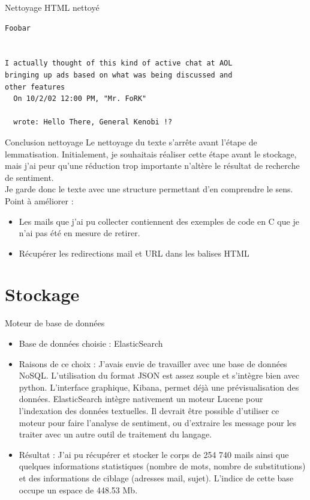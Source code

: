 \documentclass[xelatex,11pt, xcolor=dvipsnames]{beamer}
\begin{document}
\begin{frame}[fragile]{Nettoyage HTML nettoyé}
\small
\begin{verbatim}
Foobar


I actually thought of this kind of active chat at AOL 
bringing up ads based on what was being discussed and 
other features
  On 10/2/02 12:00 PM, "Mr. FoRK" 
   
  wrote: Hello There, General Kenobi !?
\end{verbatim}
\normalsize
\end{frame}

\begin{frame}{Conclusion nettoyage}
	Le nettoyage du texte s'arrête avant l'étape de lemmatisation. 
	Initialement, je souhaitais réaliser cette étape avant le stockage, 
	mais j'ai peur qu'une réduction trop importante n'altère le résultat de recherche de sentiment.\\
	
	Je garde donc le texte avec une structure permettant d'en comprendre le sens. \\
	
	Point à améliorer :
	\begin{itemize}
		\item Les mails que j'ai pu collecter contiennent des exemples de code en C que je n'ai pas été en mesure de retirer.
		\item Récupérer les redirections mail et URL dans les balises HTML
 	\end{itemize}  
\end{frame}


\section{Stockage}

\begin{frame}{Moteur de base de données}
  \begin{itemize}
  \item Base de données choisie : ElasticSearch
  \item Raisons de ce choix : J'avais envie de travailler avec une base de données NoSQL.
  		L'utilisation du format JSON est assez souple et s'intègre bien avec python. 
  		L'interface graphique, Kibana, permet déjà une prévisualisation des données. 
  		ElasticSearch intègre nativement un moteur Lucene pour l'indexation des données textuelles. 
  		Il devrait être possible d'utiliser ce moteur pour faire l'analyse de sentiment, ou d'extraire les message pour les traiter avec un autre outil de traitement du langage.
  \item Résultat : J'ai pu récupérer et stocker le corps de 254 740 mails ainsi que quelques informations statistiques (nombre de mots, nombre de substitutions) et des informations de ciblage (adresses mail, sujet). L'indice de cette base occupe un espace de 448.53 Mb.
  \end{itemize}
\end{frame}
\end{document}
